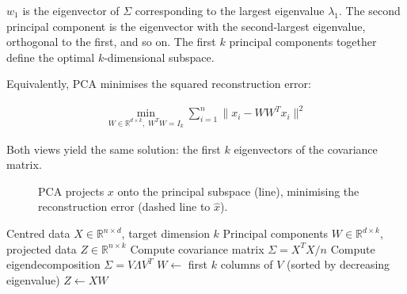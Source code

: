  $w_1$ is the eigenvector of $\Sigma$ corresponding to the largest eigenvalue $\lambda_1$.
The second principal component is the eigenvector with the second-largest eigenvalue, orthogonal to the first, and so on.
The first $k$ principal components together define the optimal $k$-dimensional subspace.

Equivalently, PCA minimises the squared reconstruction error:

\begin{align*}
    \min_{W \in \mathbb{R}^{d \times k},\; W^T W = I_k} \sum_{i=1}^n \|x_i - WW^T x_i\|^2
\end{align*}

Both views yield the same solution: the first $k$ eigenvectors of the covariance matrix.

\begin{figure}
\centering
{}
\caption{PCA projects $x$ onto the principal subspace (line), minimising the reconstruction error (dashed line to $\hat{x}$).}
\label{fig:pca_reconstruction}
\end{figure}


\begin{algorithm}[H]
\caption{PCA via Eigendecomposition}
\begin{algorithmic}[1]
\Require Centred data $X \in \mathbb{R}^{n \times d}$, target dimension $k$
\Ensure Principal components $W \in \mathbb{R}^{d \times k}$, projected data $Z \in \mathbb{R}^{n \times k}$
\State Compute covariance matrix $\Sigma = X^T X / n$
\State Compute eigendecomposition $\Sigma = V \Lambda V^T$
\State $W \gets$ first $k$ columns of $V$ (sorted by decreasing eigenvalue)
\State $Z \gets X W$ 
\end{algorithmic}
\end{algorithm}

